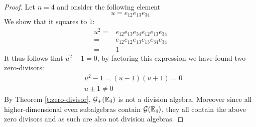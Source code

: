 \begin{proof}
	Let $n = 4$ and onsider the following element
	\[u = e_{12}e_{13}e_{34}\]
	We show that it squares to $1$:
	\begin{align*}
		u^2 = &e_{12}e_{13}e_{34}e_{12}e_{13}e_{34}\\
			= &e_{12}e_{12}e_{13}e_{13}e_{34}e_{34}\\
			= &1
	\end{align*}
	It thus follows that $u^2 - 1 = 0$, by factoring this expression we have found two zero-divisors:
	\begin{align*}
		&u^2 - 1 = (u-1)(u+1) = 0 \\
		&u \pm 1 \neq 0
	\end{align*}
	By Theorem \ref{t:zero-divisor}, $\mathcal{G}_+(\mathbb{E}_4)$ is not a division algebra. Moreover since all higher-dimensional even subalgebras contain $\mathcal{G}(\mathbb{E}_4)$, they all contain the above zero divisors and as such are also not division algebras.
\end{proof}
